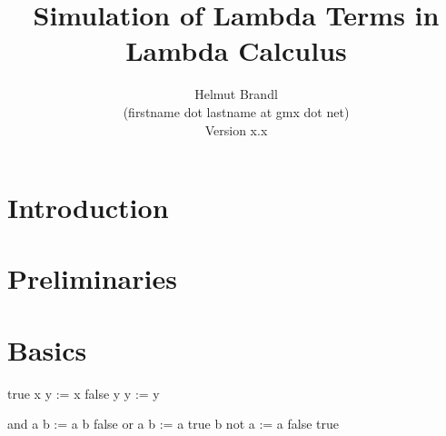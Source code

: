 \documentclass[12pt]{article}
\begin{document}


\title{
    Simulation of Lambda Terms in Lambda Calculus
}

\author{
    Helmut Brandl
    \\
    \scriptsize (firstname dot lastname at gmx dot net)
    \\
    \scriptsize Version x.x
}
\date{}

\maketitle









\tableofcontents






\section{Introduction}








\section{Preliminaries}

\cite{brandl-lambda-programming}

\cite{BARENDREGT1987191}







\section{Basics}


\begin{lam}
    true  x y := x
    false y y := y

    and a b := a b false
    or  a b := a true b
    not a   := a false true
\end{lam}
\end{document}
